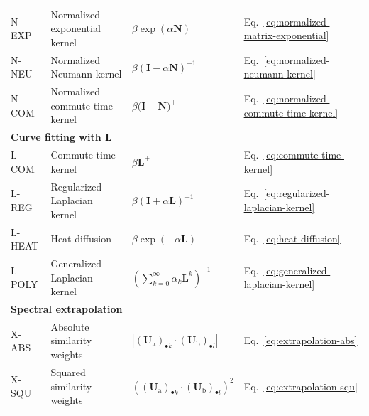 \documentclass[11pt,a4paper]{book}
\begin{document}
\begin{table}
\begin{tabular}{ l l @{\qquad} l @{\qquad} l }
    \textrm{N-EXP} & Normalized exponential kernel & $\beta \exp(\alpha
    \mathbf N)$ & Eq.~\ref{eq:normalized-matrix-exponential} \\
    \textrm{N-NEU} & Normalized Neumann kernel &$\beta (\mathbf I -
    \alpha \mathbf N)^{-1}$& Eq.~\ref{eq:normalized-neumann-kernel} \\
    \textrm{N-COM} & Normalized commute-time kernel & $\beta \mathbf
    (\mathbf I - \mathbf N)^+$ & Eq.~\ref{eq:normalized-commute-time-kernel} \\
    \midrule
    \multicolumn{4}{l}{\textbf{Curve fitting with $\mathbf L$}} \\
    \textrm{L-COM} & Commute-time kernel & $\beta \mathbf L^+$ &
    Eq.~\ref{eq:commute-time-kernel} \\ 
    \textrm{L-REG} & Regularized Laplacian kernel & $\beta (\mathbf I
    +\alpha\mathbf L)^{-1}$ &
    Eq.~\ref{eq:regularized-laplacian-kernel} \\ 
    \textrm{L-HEAT} & Heat diffusion & $\beta\exp(-\alpha\mathbf L)$ &
    Eq.~\ref{eq:heat-diffusion} \\ 
    \textrm{L-POLY} & Generalized Laplacian kernel
    & $\left(\sum_{k=0}^\infty \alpha_k \mathbf L^k \right)^{-1}$ 
    & Eq.~\ref{eq:generalized-laplacian-kernel} \\
    \midrule
    \multicolumn{4}{l}{\textbf{Spectral extrapolation}} \\
    \textrm{X-ABS} & Absolute similarity weights 
    & $\left|(\mathbf U_{\mathrm a})_{\bullet k} \cdot (\mathbf
    U_{\mathrm b})_{\bullet l}\right|$ 
    & Eq.~\ref{eq:extrapolation-abs}\\
    \textrm{X-SQU} & Squared similarity weights  
    & $\left( (\mathbf U_{\mathrm a})_{\bullet k} \cdot (\mathbf
    U_{\mathrm b})_{\bullet l} \right)^2$ 
    & Eq.~\ref{eq:extrapolation-squ}\\
    \bottomrule 
  \end{tabular}
  \label{tab:all-link-prediction}
\end{table}
\end{document}

